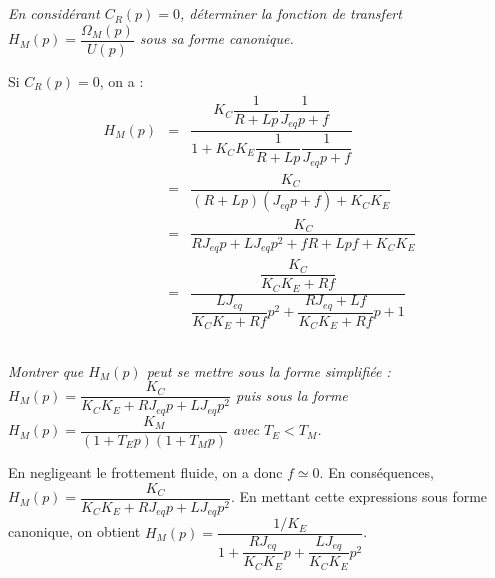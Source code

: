 \documentclass[10pt,fleqn]{article} %
\begin{document}
\begin{multicols}{2}
\begin{corrige}
\begin{center}
\noindent\footnotesize{
}

\end{center}
\end{corrige}
\else
\fi

\subparagraph{}
\textit{En considérant $C_R(p)=0$, déterminer la fonction de transfert $H_M(p)=\dfrac{\Omega_M(p)}{U(p)}$ sous sa forme canonique.}
\ifprof
\begin{corrige}
Si $C_R(p)=0$, on a : 
\begin{eqnarray*}
H_M(p) &=& \dfrac{K_C  \dfrac{1}{R+Lp}  \dfrac{1}{J_{eq}p + f} }{1+K_CK_E  \dfrac{1}{R+Lp}  \dfrac{1}{J_{eq}p + f}} \\
& = & \dfrac{K_C }{\left(R+Lp\right) \left(J_{eq}p + f \right) +K_CK_E} \\
& = & \dfrac{K_C }{ RJ_{eq}p +LJ_{eq}p^2 + fR +Lpf +K_CK_E} \\
& = & \dfrac{\dfrac{K_C}{K_CK_E + Rf} }{ \dfrac{LJ_{eq}}{K_CK_E + Rf}p^2 + \dfrac{ RJ_{eq}+Lf}{K_CK_E + Rf} p + 1} \\
\end{eqnarray*}
\end{corrige}
\else
\fi
\subparagraph{}
\textit{Montrer que $H_M(p)$ peut se mettre sous la forme simplifiée : $H_M(p)=\dfrac{K_C}{K_C K_E + RJ_{eq} p + LJ_{eq} p^2}$ puis sous la forme $H_M(p)=\dfrac{K_M}{\left(1+T_E p \right)\left(1+T_M p \right)}$ avec $T_E<T_M$.}
\ifprof
\begin{corrige}
En negligeant le frottement fluide, on a donc $f\simeq 0$. En conséquences, $H_M(p)=\dfrac{K_C}{K_C K_E + RJ_{eq} p + LJ_{eq} p^2}$. En mettant cette expressions sous forme canonique, on obtient  
$H_M(p)=\dfrac{1/K_E}{1+ \dfrac{RJ_{eq}}{K_C K_E} p + \dfrac{LJ_{eq}}{K_C K_E} p^2}$.


\end{corrige}
\end{multicols}
\end{document}
